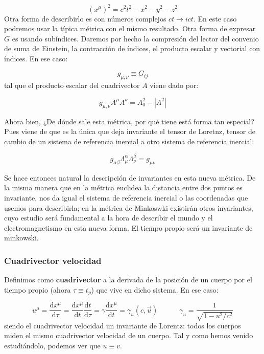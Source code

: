 \documentclass[12pt,a4paper]{article}
\newcommand{\parentesis}[1]{\left( #1  \right)}
\newcommand{\D}{\mathrm{d}}
\newcommand{\tquad}{\quad \quad \quad}
\numberwithin{equation}{section}
\numberwithin{figure}{section}
\begin{document}
\begin{equation}
\parentesis{x^\mu}^2 =  c^2 t^2 - x^2 - y^2 - z^2 
\end{equation}
Otra forma de describirlo es con números complejos $c t \rightarrow i c t$. En este caso podremos usar la típica métrica con el mismo resultado. Otra forma de expresar $G$ es usando subíndices. Daremos por hecho la compresión del lector del convenio de suma de Einstein, la contracción de índices, el producto escalar y vectorial con índices. En ese caso:

\begin{equation}
g_{\mu,\nu} \equiv G_{ij}
\end{equation}
tal que el producto escalar del cuadrivector $A$ viene dado por:

\begin{equation}
g_{\mu,\nu} A^{\mu} A^{\nu} = A_0^2 - |A^2|
\end{equation}

Ahora bien, ¿De dónde sale esta métrica, por qué tiene está forma tan especial? Pues viene de que es la única que deja invariante el tensor de Loretnz, tensor de cambio de un sistema de referencia inercial a otro sistema de referencia inercial: 

\begin{equation}
g_{\alpha \beta} \Lambda_{\mu}^{\alpha} \Lambda_{\nu}^\beta = g_{\mu \nu }
\end{equation}

Se hace entonces natural la descripción de invariantes en esta nueva métrica. De la misma manera que en la métrica euclidea la distancia entre dos puntos es invariante, nos da igual el sistema de referencia inercial o las coordenadas que usemos para describirla; en la métrica de Minkoswki existirán otros invariantes, cuyo estudio será fundamental a la hora de describir el mundo y el electromagnetismo en esta nueva forma. El tiempo propio será un invariante de minkowski. \\

\subsubsection{Cuadrivector velocidad}

Definimos como \textbf{cuadrivector} a la derivada de la posición de un cuerpo por el tiempo propio (ahora $\tau \equiv t_p$) que vive en dicho sistema. En ese caso:

\begin{equation}
u^\mu = \dfrac{\D x^\mu}{\D \tau} = \dfrac{\D x^\mu}{\D t} \dfrac{\D t}{\D \tau} = \gamma\dfrac{\D x^\mu}{\D t} = \gamma_u (c,\vec{u})  \tquad \gamma_u = \dfrac{1}{\sqrt{1-u^2 / c^2}}
\end{equation}
siendo el cuadrivector velocidad un invariante de Lorentz: todos los cuerpos miden el mismo cuadrivector velocidad de un cuerpo. Tal y como hemos venido estudiándolo, podemos ver que $u \equiv v$. 
\end{document}
